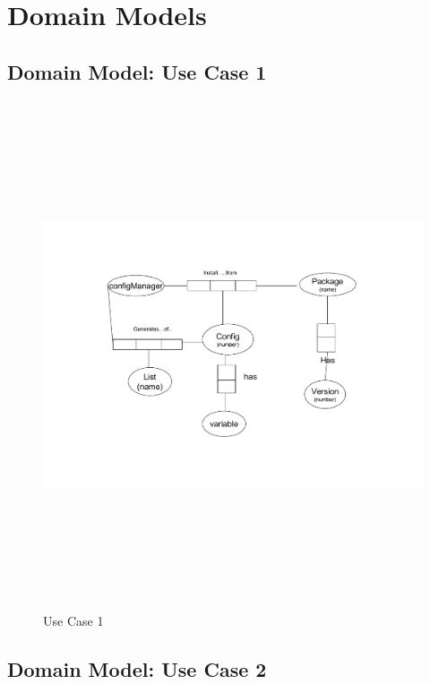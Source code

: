 \newpage
\section{Domain Models}

\subsection{Domain Model: Use Case 1}

\begin{figure}[htbp]
  \centering
  \includegraphics[angle=0,width=15cm,height=15cm]{"domainmodel-usecase1"}
  \caption{Use Case 1}
  \label{fig:usecase1}
\end{figure}

\newpage
\subsection{Domain Model: Use Case 2}

